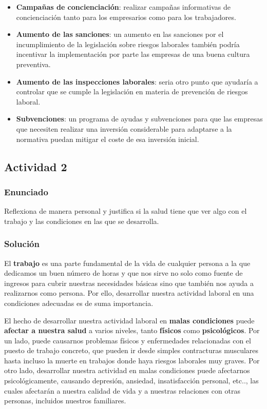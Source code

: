 \begin{itemize}
    \item \textbf{Campañas de concienciación}: realizar campañas informativas de concienciación tanto para los empresarios como para los trabajadores.

    \item \textbf{Aumento de las sanciones}: un aumento en las sanciones por el incumplimiento de la legislación sobre riesgos laborales también podría incentivar la implementación por parte las empresas de una buena cultura preventiva.

    \item \textbf{Aumento de las  inspecciones laborales}: seria otro punto que ayudaría a controlar que se cumple la legislación en materia de prevención de riesgos laboral.

    \item \textbf{Subvenciones}: un programa de ayudas y subvenciones para que las empresas que necesiten realizar una inversión considerable para adaptarse a la normativa puedan mitigar el coste de esa inversión inicial.
\end{itemize}

\subsection{Actividad 2}

\subsubsection{Enunciado}
Reflexiona de manera personal y justifica si la salud tiene que ver algo con el trabajo y las condiciones en las que se desarrolla.

\subsubsection{Solución}
El \textbf{trabajo} es una parte fundamental de la vida de cualquier persona a la que dedicamos un buen número de horas y que nos sirve no solo como fuente de ingresos para cubrir nuestras necesidades básicas sino que también nos ayuda a realizarnos como persona. Por ello, desarrollar nuestra actividad laboral en una condiciones adecuadas es de suma importancia.

El hecho de desarrollar nuestra actividad laboral en \textbf{malas condiciones} puede \textbf{afectar a nuestra salud} a varios niveles, tanto \textbf{físicos} como \textbf{psicológicos}. Por un lado, puede causarnos problemas físicos y enfermedades relacionadas con el puesto de trabajo concreto, que pueden ir desde simples contracturas musculares hasta incluso la muerte en trabajos donde haya riesgos laborales muy graves. Por otro lado, desarrollar nuestra actividad en malas condiciones puede afectarnos psicológicamente, causando depresión, ansiedad, insatisfacción personal, etc.., las cuales afectarán a nuestra calidad de vida y a nuestras relaciones con otras personas, incluidos nuestros familiares.

